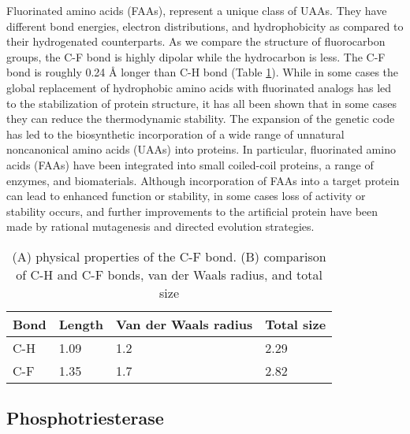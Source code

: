 \begin{refsection}
Fluorinated amino acids (FAAs), represent a unique class of UAAs. They have
different bond energies, electron distributions, and
hydrophobicity\cite{Biffinger2004} as compared to their hydrogenated
counterparts. As we compare the structure of fluorocarbon groups, the C-F bond
is highly dipolar while the hydrocarbon is less. The C-F bond is roughly 0.24
{\AA} longer than C-H bond (Table \ref{tab:c-fbond})\cite{Tang2001}. While in
some cases the global replacement of hydrophobic amino acids with fluorinated
analogs has led to the stabilization of protein structure\cite{Biffinger2004},
it has all been shown that in some cases they can reduce the thermodynamic
stability\cite{Panchenko2006b}. The expansion of the genetic code has led to
the biosynthetic incorporation of a wide range of unnatural noncanonical amino acids
(UAAs) into proteins\cite{Voloshchuk2010}. In particular, fluorinated amino
acids (FAAs) have been integrated into small coiled-coil
proteins\cite{Montclare2009b,Tang2001}, a range of
enzymes\cite{Voloshchuk2009,Panchenko2006b,Voloshchuk2007b,Mehta2011b,Hammill2007},
and biomaterials\cite{Yuvienco2012b}. Although incorporation of FAAs into a
target protein can lead to enhanced function or stability, in some cases loss
of activity or stability occurs, and further improvements to the artificial
protein have been made by rational mutagenesis\cite{Voloshchuk2007b} and
directed evolution strategies\cite{Montclare2006b}.
\begin{table}[h!]
\centering
\begin{tabular}{ llll }
  \hline
  Bond & Length & Van der Waals radius & Total size \\
  \hline

  C-H & 1.09 & 1.2 & 2.29 \\
  C-F & 1.35 & 1.7 & 2.82 \\

  \hline
\end{tabular}
\caption{(A) physical properties of the C-F bond. (B) comparison of C-H and C-F
bonds, van der Waals radius, and total size} 
\label{tab:c-fbond}
\end{table}

\subsection{Phosphotriesterase} 
\label{sec:pte-intro}


\end{refsection}
